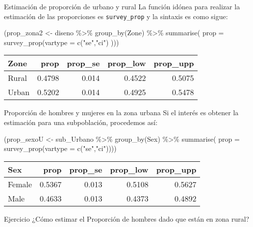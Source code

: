 \documentclass[
  ignorenonframetext,
]{beamer}
\newenvironment{Shaded}{\begin{snugshade}}{\end{snugshade}}
\newcommand{\AttributeTok}[1]{\textcolor[rgb]{0.77,0.63,0.00}{#1}}
\newcommand{\FunctionTok}[1]{\textcolor[rgb]{0.00,0.00,0.00}{#1}}
\newcommand{\NormalTok}[1]{#1}
\newcommand{\OtherTok}[1]{\textcolor[rgb]{0.56,0.35,0.01}{#1}}
\newcommand{\SpecialCharTok}[1]{\textcolor[rgb]{0.00,0.00,0.00}{#1}}
\newcommand{\StringTok}[1]{\textcolor[rgb]{0.31,0.60,0.02}{#1}}
\begin{document}
\begin{frame}[fragile]{Estimación de proporción de urbano y rural}
\protect\hypertarget{estimaciuxf3n-de-proporciuxf3n-de-urbano-y-rural-1}{}
La función idónea para realizar la estimación de las proporciones es
\texttt{survey\_prop} y la sintaxis es como sigue:

\begin{Shaded}
\begin{Highlighting}[]
\NormalTok{(prop\_zona2 }\OtherTok{\textless{}{-}}\NormalTok{ diseno }\SpecialCharTok{\%\textgreater{}\%} \FunctionTok{group\_by}\NormalTok{(Zone) }\SpecialCharTok{\%\textgreater{}\%} 
   \FunctionTok{summarise}\NormalTok{(}
     \AttributeTok{prop =} \FunctionTok{survey\_prop}\NormalTok{(}\AttributeTok{vartype =} \FunctionTok{c}\NormalTok{(}\StringTok{"se"}\NormalTok{,}\StringTok{"ci"}\NormalTok{) )))}
\end{Highlighting}
\end{Shaded}

\begin{longtable}[]{@{}lrrrr@{}}
\toprule
Zone & prop & prop\_se & prop\_low & prop\_upp \\
\midrule
\endhead
Rural & 0.4798 & 0.014 & 0.4522 & 0.5075 \\
Urban & 0.5202 & 0.014 & 0.4925 & 0.5478 \\
\bottomrule
\end{longtable}
\end{frame}

\begin{frame}[fragile]{Proporción de hombres y mujeres en la zona
urbana}
\protect\hypertarget{proporciuxf3n-de-hombres-y-mujeres-en-la-zona-urbana}{}
Si el interés es obtener la estimación para una subpoblación, procedemos
así:

\begin{Shaded}
\begin{Highlighting}[]
\NormalTok{(prop\_sexoU }\OtherTok{\textless{}{-}}\NormalTok{ sub\_Urbano }\SpecialCharTok{\%\textgreater{}\%} \FunctionTok{group\_by}\NormalTok{(Sex) }\SpecialCharTok{\%\textgreater{}\%} 
   \FunctionTok{summarise}\NormalTok{(}
       \AttributeTok{prop =} \FunctionTok{survey\_prop}\NormalTok{(}\AttributeTok{vartype =} \FunctionTok{c}\NormalTok{(}\StringTok{"se"}\NormalTok{,}\StringTok{"ci"}\NormalTok{))))}
\end{Highlighting}
\end{Shaded}

\begin{longtable}[]{@{}lrrrr@{}}
\toprule
Sex & prop & prop\_se & prop\_low & prop\_upp \\
\midrule
\endhead
Female & 0.5367 & 0.013 & 0.5108 & 0.5627 \\
Male & 0.4633 & 0.013 & 0.4373 & 0.4892 \\
\bottomrule
\end{longtable}

\pause

\begin{block}{Ejercicio}
\protect\hypertarget{ejercicio}{}
¿Cómo estimar el Proporción de hombres dado que están en zona rural?
\end{block}
\end{frame}
\end{document}
